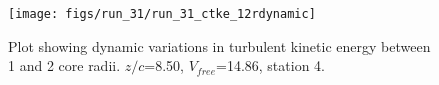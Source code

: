 \begin{figure}[H]
\centering
\texttt{[image: figs/run\_31/run\_31\_ctke\_12rdynamic]}
\caption{Plot showing dynamic variations in turbulent kinetic energy between 1 and 2 core radii. $z/c$=8.50, $V_{free}$=14.86, station 4.}
\label{fig:run_31_ctke_12rdynamic}
\end{figure}



